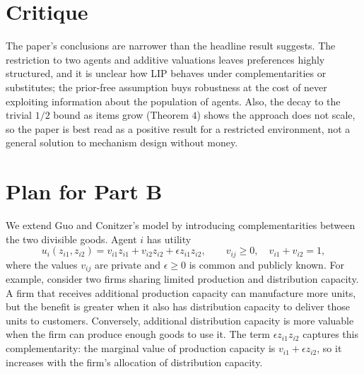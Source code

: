

\section{Critique}
The paper’s conclusions are narrower than the headline result suggests. The restriction to two agents and
additive valuations leaves preferences highly structured, and it is unclear how LIP behaves under complementarities or substitutes; the prior-free assumption buys robustness at the cost of never exploiting information
about the population of agents.
Also, the decay to the trivial $1/2$ bound as items grow (Theorem $4$) shows the approach does not scale, so
the paper is best read as a positive result for a restricted environment, not a general solution to mechanism
design without money.

\section{Plan for Part B}
We extend Guo and Conitzer's model by introducing complementarities between the two divisible goods. Agent $i$ has utility
\[
u_i(z_{i1},z_{i2})
=v_{i1}z_{i1}+v_{i2}z_{i2}+\epsilon z_{i1}z_{i2},
\qquad v_{ij}\geq0,\quad v_{i1}+v_{i2}=1,
\]
where the values $v_{ij}$ are private and $\epsilon\geq0$ is common and publicly known. For example, consider two firms sharing limited production and distribution capacity. A firm that receives additional production capacity can manufacture more units, but the benefit is greater when it also has distribution capacity to deliver those units to customers. Conversely, additional distribution capacity is more valuable when the firm can produce enough goods to use it. The term $\epsilon z_{i1}z_{i2}$ captures this complementarity: the marginal value of production capacity is $v_{i1}+\epsilon z_{i2}$, so it increases with the firm's allocation of distribution capacity.


